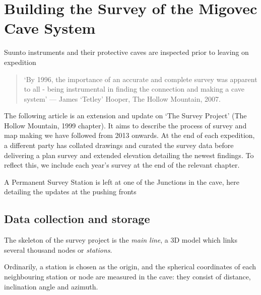 \chapter{Building the Survey of the Migovec Cave System}
\begin{marginfigure}
\checkoddpage \ifoddpage \forcerectofloat \else \forceversofloat \fi
\centering
 \caption{Suunto instruments and their protective caves are inspected prior to leaving on expedition }
 \label{compass}
\end{marginfigure}

\begin{quote}
`By 1996, the importance of an accurate and complete survey was apparent to all - being instrumental  in finding the connection and making a cave system' --- James `Tetley' Hooper, The Hollow Mountain, 2007. 
\end{quote}

The following article is an extension and update  on `The Survey Project' (The Hollow Mountain, 1999 chapter). It aims to describe the process of survey and map making we have followed from 2013 onwards. At the end of each expedition, a different party has collated drawings and curated the survey data before delivering a plan survey and extended elevation detailing the newest findings. To reflect this, we include each year's survey at the end of the relevant chapter.

\begin{marginfigure}
\checkoddpage \ifoddpage \forcerectofloat \else \forceversofloat \fi
\centering
 \caption{A Permanent Survey Station is left at one of the Junctions in the cave, here detailing the updates at the pushing fronts }
 \label{fig:PSS}
\end{marginfigure}


\section{Data collection and storage}
The skeleton of the survey project is the \emph{main line}, a 3D model which links several thousand nodes or \emph{stations}. 

Ordinarily, a station is chosen as the origin, and the spherical coordinates of each neighbouring station or node are measured in the cave: they consist of distance, inclination angle and azimuth. 

